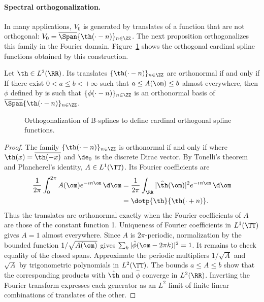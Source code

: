 \paragraph{Spectral orthogonalization.}

In many applications, $V_0$ is generated by translates of a function that are not orthogonal: $V_0=\overline{\Span}\{\th(\cdot-n)\}_{n\in\ZZ}$. The next proposition orthogonalizes this family in the Fourier domain.
%
Figure~\ref{fig-spline-ortho} shows the orthogonal cardinal spline functions obtained by this construction.

\begin{prop}\label{prop-spectral-ortho}
	Let $\th \in L^2(\RR)$. Its translates $\{\th(\cdot-n)\}_{n \in \ZZ}$ are orthonormal if and only if
	If there exist $0 < a \leq b <+\infty$ such that $a \leq A(\om) \leq b$ almost everywhere, then $\phi$ defined by
	is such that $\{\phi(\cdot-n)\}_{n \in \ZZ}$ is an orthonormal basis of $\overline{\Span}\{\th(\cdot-n)\}_{n\in\ZZ}$.
\end{prop}


\begin{figure}[tbp]
\centering
{}
\caption{Orthogonalization of B-splines to define cardinal orthogonal spline functions.}
\label{fig-spline-ortho}
\end{figure}

\begin{proof}
	The family $\{\th(\cdot-n)\}_{n \in \ZZ}$ is orthonormal if and only if
	where $\bar\th(x)=\overline{\th(-x)}$ and $\de_0$ is the discrete Dirac vector.
By Tonelli's theorem and Plancherel's identity, $A\in L^1(\TT)$. Its Fourier coefficients are
	\begin{align*}
		\frac{1}{2\pi}\int_0^{2\pi}A(\om)e^{-\imath n\om}\,\d\om
		&=\frac{1}{2\pi}\int_\RR |\hat\th(\om)|^2e^{-\imath n\om}\,\d\om\\
		&=\dotp{\th}{\th(\cdot+n)}.
	\end{align*}
	Thus the translates are orthonormal exactly when the Fourier coefficients of $A$ are those of the constant function 1. Uniqueness of Fourier coefficients in $L^1(\TT)$ gives $A=1$ almost everywhere.
	Since $A$ is $2\pi$-periodic, normalization by the bounded function $1/\sqrt{A(\om)}$ gives $\sum_{k} |\hat \phi(\om-2\pi k)|^2 = 1$. It remains to check equality of the closed spans. Approximate the periodic multipliers $1/\sqrt A$ and $\sqrt A$ by trigonometric polynomials in $L^2(\TT)$. The bounds $a\leq A\leq b$ show that the corresponding products with $\hat\th$ and $\hat\phi$ converge in $L^2(\RR)$. Inverting the Fourier transform expresses each generator as an $L^2$ limit of finite linear combinations of translates of the other.
\end{proof}

